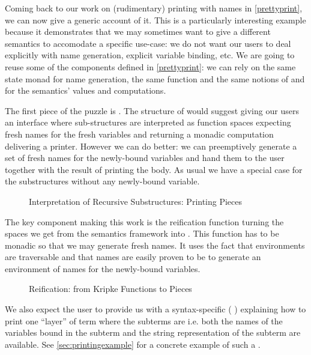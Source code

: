Coming back to our work on (rudimentary) printing with names in \cref{prettyprint},
we can now give a generic account of it. This is a particularly interesting example
because it demonstrates that we may sometimes want to give  a different
semantics to accomodate a specific use-case: we do not want our users to deal explicitly
with name generation, explicit variable binding, etc. We are going to reuse some of the
components defined in \cref{prettyprint}: we can rely on the same state monad for
name generation, the same  function and the same notions of 
and  for the semantics' values and computations.

The first piece of the puzzle is . The structure of  would
suggest giving our users an interface where sub-structures are interpreted as 
function spaces expecting fresh names for the fresh variables and returning a monadic
computation delivering a printer. However we can do better: we can preemptively generate
a set of fresh names for the newly-bound variables and hand them to the user together
with the result of printing the body. As usual we have a special case for the substructures
without any newly-bound variable.

\begin{figure}[h]
\caption{Interpretation of Recursive Substructures: Printing Pieces\label{fig:printingpieces}}
\end{figure}

The key component making this work is the reification function 
turning the  spaces we get from the semantics framework into . This
function has to be monadic so that we may generate fresh names. It uses the fact that
environments are traversable and that names are easily proven to be  to
generate an environment of names for the newly-bound variables.

\begin{figure}[h]
\caption{Reification: from Kripke Functions to Pieces\label{fig:printingreify}}
\end{figure}

We also expect the user to provide us with a syntax-specific ({ })
explaining how to print one ``layer'' of term where the subterms are  i.e.
both the names of the variables bound in the subterm and the string representation of
the subterm are available. See \cref{sec:printingexample} for a concrete example of
such a .

